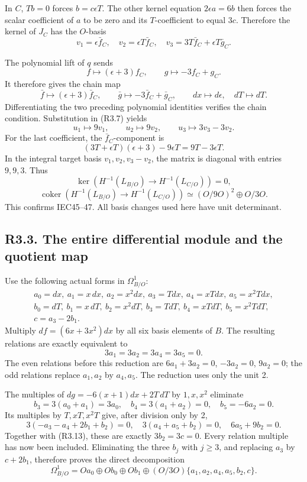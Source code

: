 \documentclass[
]{article}
\begin{document}
In \(C\), \(Tb=0\) forces \(b=c\epsilon T\). The other kernel equation
\(2\epsilon a=6b\) then forces the scalar coefficient of \(a\) to be
zero and its \(T\)-coefficient to equal \(3c\). Therefore the kernel of
\(J_C\) has the \(O\)-basis \[
v_1=\epsilon\bar f_C,\quad
v_2=\epsilon T\bar f_C,\quad
v_3=3T\bar f_C+\epsilon T\bar g_C.
\tag{R3.8}
\]

The polynomial lift of \(q\) sends \[
f\longmapsto(\epsilon+3)f_C,\qquad
g\longmapsto-3f_C+g_C.
\] It therefore gives the chain map \[
\bar f\longmapsto(\epsilon+3)\bar f_C,\qquad
\bar g\longmapsto-3\bar f_C+\bar g_C,\qquad
dx\longmapsto d\epsilon,\quad dT\longmapsto dT.
\tag{R3.9}
\] Differentiating the two preceding polynomial identities verifies the
chain condition. Substitution in (R3.7) yields \[
u_1\longmapsto9v_1,\qquad
u_2\longmapsto9v_2,\qquad
u_3\longmapsto3v_3-3v_2.
\tag{R3.10}
\] For the last coefficient, the \(\bar f_C\)-component is \[
(3T+\epsilon T)(\epsilon+3)-9\epsilon T
=9T-3\epsilon T.
\] In the integral target basis \(v_1,v_2,v_3-v_2\), the matrix is
diagonal with entries \(9,9,3\). Thus \[
\ker\!\left(H^{-1}(L_{B/O})\to H^{-1}(L_{C/O})\right)=0,
\] \[
\operatorname{coker}\!\left(H^{-1}(L_{B/O})\to H^{-1}(L_{C/O})\right)
\simeq(O/9O)^2\oplus O/3O.
\tag{R3.11}
\] This confirms IEC45--47. All basis changes used here have unit
determinant.

\subsection{R3.3. The entire differential module and the quotient
map}\label{r3.3.-the-entire-differential-module-and-the-quotient-map}

Use the following actual forms in \(\Omega^1_{B/O}\): \[
\begin{gathered}
a_0=dx,\ a_1=x\,dx,\ a_2=x^2dx,\ a_3=Tdx,\ 
a_4=xTdx,\ a_5=x^2Tdx,\\
b_0=dT,\ b_1=x\,dT,\ b_2=x^2dT,\ 
b_3=TdT,\ b_4=xTdT,\ b_5=x^2TdT,\\
c=a_3-2b_1.
\end{gathered}
\tag{R3.12}
\] Multiply \(df=(6x+3x^2)dx\) by all six basis elements of \(B\). The
resulting relations are exactly equivalent to \[
3a_1=3a_2=3a_4=3a_5=0.
\tag{R3.13}
\] The even relations before this reduction are \(6a_1+3a_2=0\),
\(-3a_2=0\), \(9a_2=0\); the odd relations replace \(a_1,a_2\) by
\(a_4,a_5\). The reduction uses only the unit 2.

The multiples of \(dg=-6(x+1)dx+2T\,dT\) by \(1,x,x^2\) eliminate \[
b_3=3(a_0+a_1)=3a_0,\quad
b_4=3(a_1+a_2)=0,\quad b_5=-6a_2=0.
\tag{R3.14}
\] Its multiples by \(T,xT,x^2T\) give, after division only by 2, \[
3(-a_3-a_4+2b_1+b_2)=0,\quad
3(a_4+a_5+b_2)=0,\quad
6a_5+9b_2=0.
\] Together with (R3.13), these are exactly \(3b_2=3c=0\). Every
relation multiple has now been included. Eliminating the three \(b_j\)
with \(j\ge3\), and replacing \(a_3\) by \(c+2b_1\), therefore proves
the direct decomposition \[
\Omega^1_{B/O}
=Oa_0\oplus Ob_0\oplus Ob_1
\oplus(O/3O)\{a_1,a_2,a_4,a_5,b_2,c\}.
\tag{R3.15}
\]
\end{document}
